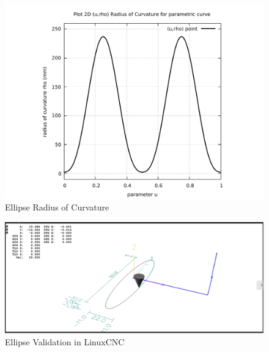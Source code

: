 \begin{figure}
	\caption     {Ellipse Radius of Curvature}
	\label{02-img-Ellipse Radius of Curvature.pdf}
	\includegraphics[width=1.00\textwidth]{Chap4/appendix/app-Ellipse/plots/02-img-Ellipse Radius of Curvature.pdf} 
\end{figure}	


\clearpage
\pagebreak

\begin{figure}
	\caption     {Ellipse Validation in LinuxCNC}
	\label{03-img-Ellipse-Validation-in-LinuxCNC.png}
	\includegraphics[width=1.00\textwidth]{Chap4/appendix/app-Ellipse/plots/03-img-Ellipse-Validation-in-LinuxCNC.png}
\end{figure}


